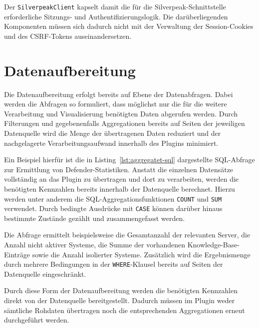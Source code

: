 Der \texttt{SilverpeakClient} kapselt damit die für die Silverpeak-Schnittstelle
erforderliche Sitzungs- und Authentifizierungslogik. Die darüberliegenden
Komponenten müssen sich dadurch nicht mit der Verwaltung der Session-Cookies
und des CSRF-Tokens auseinandersetzen.

\section{Datenaufbereitung}
\label{sec:data-aggregation}

Die Datenaufbereitung erfolgt bereits auf Ebene der Datenabfragen. Dabei werden
die Abfragen so formuliert, dass möglichst nur die für die weitere Verarbeitung
und Visualisierung benötigten Daten abgerufen werden. Durch Filterungen und
gegebenenfalls Aggregationen bereits auf Seiten der jeweiligen Datenquelle
wird die Menge der übertragenen Daten reduziert und der nachgelagerte
Verarbeitungsaufwand innerhalb des Plugins minimiert.

Ein Beispiel hierfür ist die in Listing~\ref{lst:aggregatet-sql} dargestellte
SQL-Abfrage zur Ermittlung von Defender-Statistiken. Anstatt die einzelnen
Datensätze vollständig an das Plugin zu übertragen und dort zu verarbeiten,
werden die benötigten Kennzahlen bereits innerhalb der Datenquelle berechnet.
Hierzu werden unter anderem die SQL-Aggregationsfunktionen \texttt{COUNT}
und \texttt{SUM} verwendet. Durch bedingte Ausdrücke mit \texttt{CASE} können
darüber hinaus bestimmte Zustände gezählt und zusammengefasst werden.

Die Abfrage ermittelt beispielsweise die Gesamtanzahl der relevanten Server,
die Anzahl nicht aktiver Systeme, die Summe der vorhandenen
Knowledge-Base-Einträge sowie die Anzahl isolierter Systeme. Zusätzlich wird
die Ergebnismenge durch mehrere Bedingungen in der \texttt{WHERE}-Klausel
bereits auf Seiten der Datenquelle eingeschränkt.

Durch diese Form der Datenaufbereitung werden die benötigten Kennzahlen
direkt von der Datenquelle bereitgestellt. Dadurch müssen im Plugin weder
sämtliche Rohdaten übertragen noch die entsprechenden Aggregationen erneut
durchgeführt werden.

